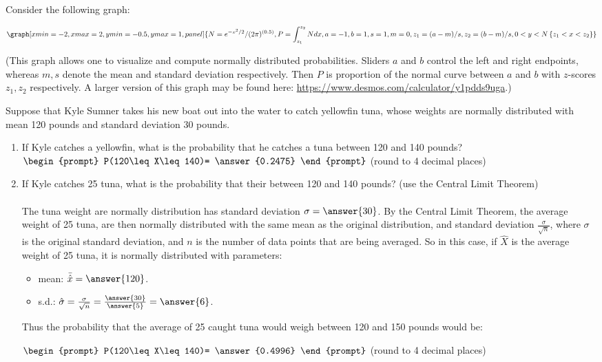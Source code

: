 \documentclass{ximera}
\begin{document}
\begin{question}

Consider the following graph:

\begin{onlineOnly}
$$\graph[xmin=-2,xmax=2,ymin=-0.5,ymax=1, panel]{N=e^{-x^2/2}/(2\pi)^{(0.5)}, P=\int_{z_1}^{z_2} N dx, a=-1, b=1, s=1, m=0, z_1=(a-m)/s, z_2=(b-m)/s, 0<y<N\left\{z_1<x<z_2\right\}}$$
\end{onlineOnly}
(This graph allows one to visualize and compute normally distributed probabilities.  Sliders $a$ and $b$ control the left and right endpoints, whereas $m, s$ denote the mean and standard deviation respectively.  Then $P$ is proportion of the normal curve between $a$ and $b$ with $z$-scores $z_1, z_2$ respectively.  A larger version of this graph may be found here: \url{https://www.desmos.com/calculator/y1pdds9uga}.)


Suppose that Kyle Sumner takes his new boat out into the water to catch yellowfin tuna, whose weights are normally distributed with mean 120 pounds and standard deviation 30 pounds.  

\begin{enumerate}
\item If Kyle catches a yellowfin, what is the probability that he catches a tuna between 120 and 140 pounds? $\begin{prompt}
    P(120\leq X\leq 140)= \answer{0.2475}
  \end{prompt}$ (round to 4 decimal places)
  \item If Kyle catches 25 tuna,  what is the probability that their between 120 and 140 pounds? (use the Central Limit Theorem)\\ \\

The tuna weight are normally distribution has standard deviation $\sigma=\answer{30}$.  By the Central Limit Theorem, the average weight of 25 tuna, are then normally distributed with the same mean as the original distribution, and standard deviation $\frac{\sigma}{\sqrt{n}}$, where $\sigma$ is the original standard deviation, and $n$ is the number of data points that are being averaged.  So in this case, if $\hat{X}$ is the average weight of 25 tuna, it is normally distributed with parameters:

\begin{itemize}
\item mean: $\bar{\hat{x}}=\answer{120}$.
\item s.d.: $\hat{\sigma}=\frac{\sigma}{\sqrt{n}}=\frac{\answer{30}}{\answer{5}}=\answer{6}$.
\end{itemize}

Thus the probability that the average of 25 caught tuna would weigh between 120 and 150 pounds would be:

  $\begin{prompt}
    P(120\leq X\leq 140)= \answer{0.4996}
  \end{prompt}$ (round to 4 decimal places)
\end{enumerate}

\end{question}
\end{document}
